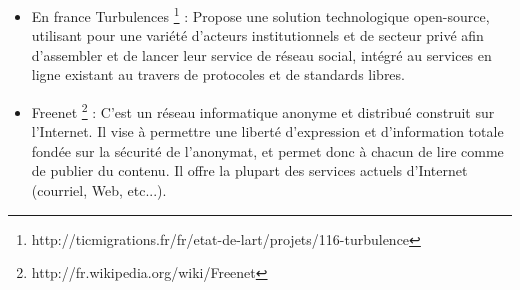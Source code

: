 \begin{itemize}
3) Si vous souhaitez déplacer les hosts vous aurez vos données et relations.
\begin{itemize}
\item Tent utilise https et JSON pour transporter les posts entre les serveurs et les applications.
\item Les entités sont les utilisateurs de Tent, ils autorisent des applications, établir des relations et lire/publier des posts les entités sont définie avec leur entité URL; https/http URL liée aux métadonnées.
\item Chaque entité a un ou plusieurs serveur qui la représente.
\item Les posts sont les atomics unité de contenu dans tent chaque post est un JSON, ils ont des fichiers attacher.
\item Tent c'est une machine de lécture en JSON api, les apps doivent être autorisée avec oauth2.
\item relationShips : Les entités établissent des relations lorsque il envoient des messages qui mentionnent d'autres entités. 
\end{itemize}
\subparagraph{}
Les fonctionnalités trouvées aussi sur les sites d'information communautaires comme \textit{hacker news} \footnote{http://thehackernews.com/} peuvent être reproduite avec tent, mais nécessairement architecturée d'une manière différente. les messages et les commentaires sont situé sur le serveur tent au lieu d'être regroupé sur un site unique ou base de donnée. 
\subparagraph{}
Les données sont stockées dans tent comme messages. Messages, comme les fichiers, sont tapés. Il y a un petit nombre de types de poste prévues par le protocole que les serveurs utilisent des tentes. Les développeurs sont libres de créer de nouveaux types de poste pour le contenu / stockage de données.
\newline
\item En france Turbulences \footnote{http://ticmigrations.fr/fr/etat-de-lart/projets/116-turbulence} : Propose une solution technologique open-source, utilisant pour une variété d'acteurs institutionnels et de secteur privé afin d'assembler et de lancer leur service de réseau social, intégré au services en ligne existant au travers de protocoles et de standards libres.
\newline
\item Freenet \footnote{http://fr.wikipedia.org/wiki/Freenet} : C'est un réseau informatique anonyme et distribué construit sur l'Internet. Il vise à permettre une liberté d'expression et d'information totale fondée sur la sécurité de l'anonymat, et permet donc à chacun de lire comme de publier du contenu. Il offre la plupart des services actuels d'Internet (courriel, Web, etc...). 
\end{itemize}
